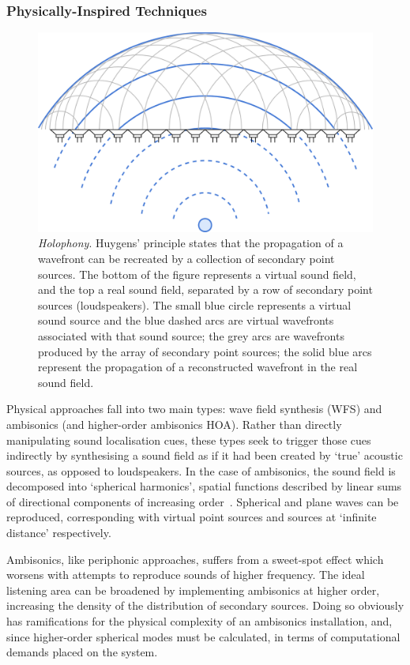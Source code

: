 \subsubsection{Physically-Inspired Techniques}\label{subsubsec:sound-field-synthesis}

\begin{figure}[ht]
    \centering
    \includegraphics[width=.75\textwidth]{figures/wfs_1}
    \caption{\textit{Holophony}.
    Huygens' principle states that the propagation of a wavefront
    can be recreated by a collection of secondary point sources.
    The bottom of the figure represents a virtual sound field, and the top a
    real sound field, separated by a row of secondary point sources
        (loudspeakers).
        The small blue circle represents a virtual sound source and the blue
        dashed arcs are virtual wavefronts associated with that sound source;
        the grey arcs are wavefronts produced by the array of secondary point
        sources;
        the solid blue arcs represent the propagation of a reconstructed
        wavefront in the real sound field.}
    \label{fig:wfs_1}
\end{figure}

Physical approaches fall into two main types: wave field synthesis (WFS) and
ambisonics (and higher-order ambisonics \textemdash{} HOA). Rather than
directly manipulating sound localisation cues, these types seek to trigger
those cues indirectly by synthesising a sound field as if it had been created
by `true' acoustic sources, as opposed to loudspeakers.
In the case of ambisonics, the sound field is decomposed into `spherical
harmonics', spatial functions described by linear sums of directional
components of increasing order~\citep{nicol_sound_2017}.
Spherical and plane waves can be reproduced, corresponding with virtual
point sources and sources at `infinite distance' respectively.

Ambisonics, like periphonic approaches, suffers from a sweet-spot effect which
worsens with attempts to reproduce sounds of higher frequency.
The ideal listening area can be broadened by implementing ambisonics at higher
order, increasing the density of the distribution of secondary sources.
Doing so obviously has ramifications for the physical complexity of an
ambisonics installation, and, since higher-order spherical modes must be
calculated, in terms of computational demands placed on the system.


